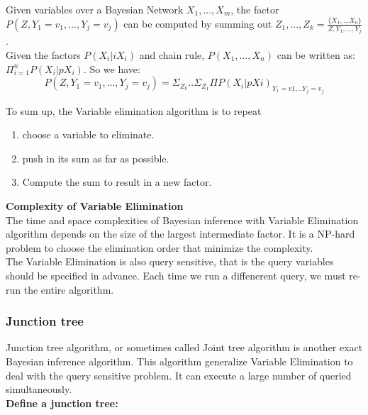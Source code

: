         \noindent Given variables over a Bayesian Network $X_{1}, ... , X_{m}$, the factor $P(Z, Y_{1}=v_{1}, ... , Y_{j}= v_{j})$ can be computed by summing out $Z_{1}, ..., Z_{k} =  \frac{\{X_{1}, ... X_{n}\}}{Z, Y_{1}, ..., Y_{j}}$.\\
        
        \noindent Given the factors $P(X_{i}|iX_{i})$ and chain rule, $P(X_{1}, ..., X_{n})$ can be written as: $\Pi_{i = 1}^{n} P(X_{i}|pX_{i})$. So we have:
        $$P(Z, Y_{1}=v_{1}, ... , Y_{j}= v_{j}) = \Sigma_{Z_{k}}.. \Sigma_{Z_{1}} \Pi P(X_{i}|pX{i})_{Y_{1} = v1, .. Y_{j} = v_{j}}$$
        
       
        \noindent To sum up, the Variable elimination algorithm is to repeat
        \begin{enumerate}
            \item choose a variable to eliminate.
            \item push in its sum as far as possible.
            \item Compute the sum to result in a new factor.
        \end{enumerate}
        \newpage
        \noindent \textbf{Complexity of Variable Elimination}\\
        
        \noindent The time and space complexities of Bayesian inference with Variable Elimination algorithm depends on the size of the largest intermediate factor. It is a NP-hard problem to choose the elimination order that minimize the complexity.\\
        
        \noindent The Variable Elimination is also query sensitive, that is the query variables should be specified in advance. Each time we run a diffenerent query, we must re-run the entire algorithm.
        
        \subsubsection{Junction tree}
        Junction tree algorithm, or sometimes called Joint tree algorithm is another exact Bayesian inference algorithm. This algorithm generalize Variable Elimination to deal with the query sensitive problem. It can execute a large number of queried simultaneously.\\
        
        \noindent \textbf{Define a junction tree:}\\
        
